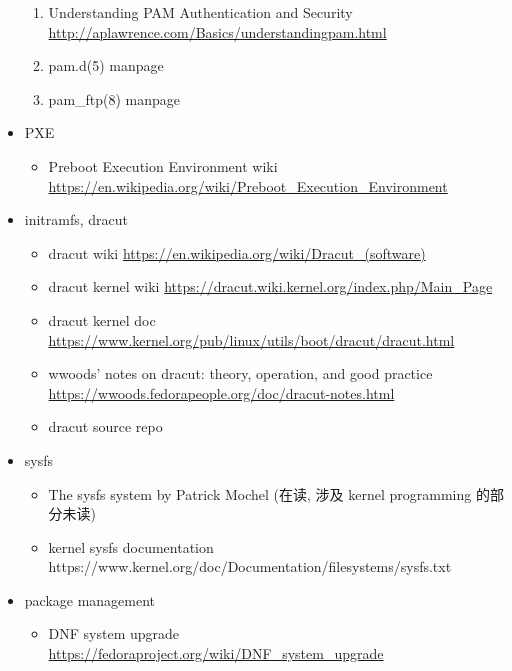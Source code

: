 \documentclass{article}
\begin{document}
\begin{itemize}
\begin{enumerate}
            \item Understanding PAM Authentication and Security \url{http://aplawrence.com/Basics/understandingpam.html}
            \item pam.d(5) manpage
            \item pam_ftp(8) manpage
        \end{enumerate}
    \item PXE
        \begin{itemize}
            \item Preboot Execution Environment wiki \url{https://en.wikipedia.org/wiki/Preboot_Execution_Environment}
        \end{itemize}
    \item initramfs, dracut
        \begin{itemize}
            \item dracut wiki \url{https://en.wikipedia.org/wiki/Dracut_(software)}
            \item dracut kernel wiki \url{https://dracut.wiki.kernel.org/index.php/Main_Page}
            \item dracut kernel doc \url{https://www.kernel.org/pub/linux/utils/boot/dracut/dracut.html}
            \item wwoods' notes on dracut: theory, operation, and good practice \url{https://wwoods.fedorapeople.org/doc/dracut-notes.html}
            \item dracut source repo
        \end{itemize}
    \item sysfs
        \begin{itemize}
            \item The sysfs system by Patrick Mochel (在读, 涉及 kernel programming 的部分未读)
            \item kernel sysfs documentation https://www.kernel.org/doc/Documentation/filesystems/sysfs.txt
        \end{itemize}
    \item package management
        \begin{itemize}
            \item DNF system upgrade \url{https://fedoraproject.org/wiki/DNF_system_upgrade}
        \end{itemize}
\end{itemize}
%
\end{document}
